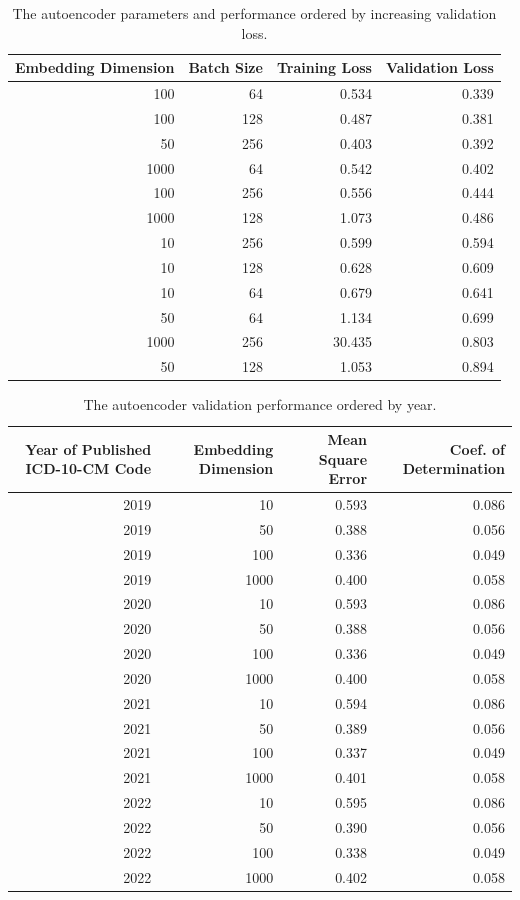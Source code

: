 \documentclass{bmcart}
\begin{document}
\begin{backmatter}
\begin{table}[ht!]
\caption{The autoencoder parameters and performance ordered by increasing validation loss.}
\label{tab:autoencoder_perf}
\begin{tabular}{|r|r|r|r|}
\hline
Embedding Dimension & Batch Size & Training Loss & Validation Loss\\
\hline
100 & 64 & 0.534 & 0.339\\
\hline
100 & 128 & 0.487 & 0.381\\
\hline
50 & 256 & 0.403 & 0.392\\
\hline
1000 & 64 & 0.542 & 0.402\\
\hline
100 & 256 & 0.556 & 0.444\\
\hline
1000 & 128 & 1.073 & 0.486\\
\hline
10 & 256 & 0.599 & 0.594\\
\hline
10 & 128 & 0.628 & 0.609\\
\hline
10 & 64 & 0.679 & 0.641\\
\hline
50 & 64 & 1.134 & 0.699\\
\hline
1000 & 256 & 30.435 & 0.803\\
\hline
50 & 128 & 1.053 & 0.894\\

\hline
\end{tabular}
\end{table}

\begin{table}[ht!]
\caption{The autoencoder validation performance ordered by year.}
\label{tab:autoencoder_year}
\begin{tabular}{|r|r|r|r|}
\hline
Year of Published ICD-10-CM Code& Embedding Dimension & Mean Square Error& Coef. of Determination\\
\hline
2019 & 10 & 0.593 & 0.086\\
\hline
2019 & 50 & 0.388 & 0.056\\
\hline
2019 & 100 & 0.336 & 0.049\\
\hline
2019 & 1000 & 0.400 & 0.058\\
\hline
2020 & 10 & 0.593 & 0.086\\
\hline
2020 & 50 & 0.388 & 0.056\\
\hline
2020 & 100 & 0.336 & 0.049\\
\hline
2020 & 1000 & 0.400 & 0.058\\
\hline
2021 & 10 & 0.594 & 0.086\\
\hline
2021 & 50 & 0.389 & 0.056\\
\hline
2021 & 100 & 0.337 & 0.049\\
\hline
2021 & 1000 & 0.401 & 0.058\\
\hline
2022 & 10 & 0.595 & 0.086\\
\hline
2022 & 50 & 0.390 & 0.056\\
\hline
2022 & 100 & 0.338 & 0.049\\
\hline
2022 & 1000 & 0.402 & 0.058\\
\hline
\end{tabular}
\end{table}


\end{backmatter}
\end{document}
